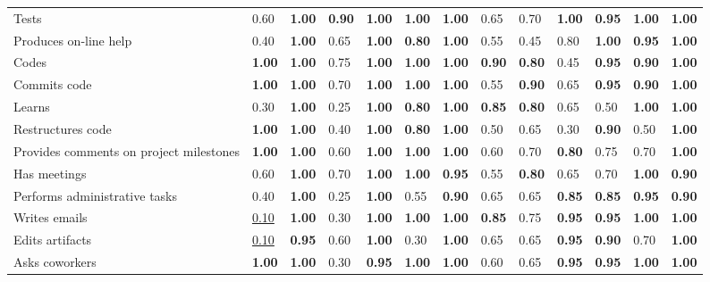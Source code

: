 \begin{tabular}{lllllllllllll}
Tests & 0.60 & \textbf{1.00} & \textbf{0.90} & \textbf{1.00} & \textbf{1.00} & \textbf{1.00} & 0.65 & 0.70 & \textbf{1.00} & \textbf{0.95} & \textbf{1.00} & \textbf{1.00} \\
Produces on-line help & 0.40 & \textbf{1.00} & 0.65 & \textbf{1.00} & \textbf{0.80} & \textbf{1.00} & 0.55 & 0.45 & 0.80 & \textbf{1.00} & \textbf{0.95} & \textbf{1.00} \\
Codes & \textbf{1.00} & \textbf{1.00} & 0.75 & \textbf{1.00} & \textbf{1.00} & \textbf{1.00} & \textbf{0.90} & \textbf{0.80} & 0.45 & \textbf{0.95} & \textbf{0.90} & \textbf{1.00} \\
Commits code & \textbf{1.00} & \textbf{1.00} & 0.70 & \textbf{1.00} & \textbf{1.00} & \textbf{1.00} & 0.55 & \textbf{0.90} & 0.65 & \textbf{0.95} & \textbf{0.90} & \textbf{1.00} \\
Learns & 0.30 & \textbf{1.00} & 0.25 & \textbf{1.00} & \textbf{0.80} & \textbf{1.00} & \textbf{0.85} & \textbf{0.80} & 0.65 & 0.50 & \textbf{1.00} & \textbf{1.00} \\
Restructures code & \textbf{1.00} & \textbf{1.00} & 0.40 & \textbf{1.00} & \textbf{0.80} & \textbf{1.00} & 0.50 & 0.65 & 0.30 & \textbf{0.90} & 0.50 & \textbf{1.00} \\
Provides comments on project milestones & \textbf{1.00} & \textbf{1.00} & 0.60 & \textbf{1.00} & \textbf{1.00} & \textbf{1.00} & 0.60 & 0.70 & \textbf{0.80} & 0.75 & 0.70 & \textbf{1.00} \\
Has meetings & 0.60 & \textbf{1.00} & 0.70 & \textbf{1.00} & \textbf{1.00} & \textbf{0.95} & 0.55 & \textbf{0.80} & 0.65 & 0.70 & \textbf{1.00} & \textbf{0.90} \\
Performs administrative tasks & 0.40 & \textbf{1.00} & 0.25 & \textbf{1.00} & 0.55 & \textbf{0.90} & 0.65 & 0.65 & \textbf{0.85} & \textbf{0.85} & \textbf{0.95} & \textbf{0.90} \\
Writes emails & \underline{0.10} & \textbf{1.00} & 0.30 & \textbf{1.00} & \textbf{1.00} & \textbf{1.00} & \textbf{0.85} & 0.75 & \textbf{0.95} & \textbf{0.95} & \textbf{1.00} & \textbf{1.00} \\
Edits artifacts & \underline{0.10} & \textbf{0.95} & 0.60 & \textbf{1.00} & 0.30 & \textbf{1.00} & 0.65 & 0.65 & \textbf{0.95} & \textbf{0.90} & 0.70 & \textbf{1.00} \\
Asks coworkers & \textbf{1.00} & \textbf{1.00} & 0.30 & \textbf{0.95} & \textbf{1.00} & \textbf{1.00} & 0.60 & 0.65 & \textbf{0.95} & \textbf{0.95} & \textbf{1.00} & \textbf{1.00} \\

\end{tabular}
